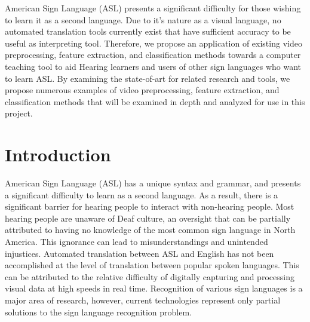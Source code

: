 \documentclass[12pt]{article}
\begin{document}


\begin{center}\end{center}
American Sign Language (ASL) presents a significant difficulty for those wishing to learn it as a 
second language. Due to it’s nature as a visual language, no automated translation tools currently exist that have sufficient accuracy to be useful as interpreting tool. Therefore, we propose an application of existing video preprocessing, feature extraction, and classification methods towards a computer teaching tool to aid Hearing learners and users of other sign languages who want to learn ASL. By examining the state-of-art for related research and tools, we propose numerous examples of video preprocessing, feature extraction, and classification methods that will be examined in depth and analyzed for use in this project.


\newpage

\onehalfspacing
\tableofcontents
\newpage
\doublespacing
{}
\listoftables
{}
\listoffigures
\newpage

\section{Introduction}
American Sign Language (ASL) has a unique syntax and grammar, and presents a significant difficulty to learn as a second language. As a result, there is a significant barrier for hearing people to interact with non-hearing people. Most hearing people are unaware of Deaf culture, an oversight that can be partially attributed to having no knowledge of the most common sign language in North America. This ignorance can lead to misunderstandings and unintended injustices. Automated translation between ASL and English has not been accomplished at the level of translation between popular spoken languages. This can be attributed to the relative difficulty of digitally capturing and processing visual data at high speeds in real time. Recognition of various sign languages is a major area of research, however, current technologies represent only partial solutions to the sign language recognition problem. 
\end{document}
